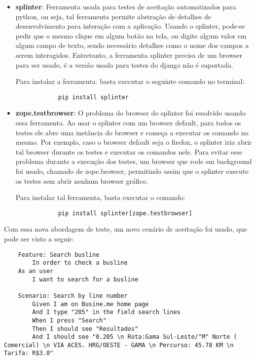     \begin{itemize}

        \item \textbf{splinter}: Ferramenta usada para testes de aceitação
            automatizados para python, ou seja, tal ferramenta permite
            abstração de detalhes de desenvolvimento para interação com a
            aplicação. Usando o splinter, pode-se pedir que o mesmo clique em
            algum botão na tela, ou digite algum valor em algum campo de texto,
            sendo necessário detalhes como o nome dos campos a serem
            interagidos. Entretanto, a ferramenta splinter precisa de um browser
            para ser usado, é a versão usada para testes do django não é
            suportada.

            Para instalar a ferramenta. basta executar o seguinte comando no
            terminal:

            \begin{verbatim}
            pip install splinter
            \end{verbatim}

        \item \textbf{zope.testbrowser}: O problema do browser do splinter foi
            resolvido usando essa ferramenta. Ao usar o splinter com um browser
            default, para todos os testes ele abre uma instância do browser e
            começa a executar os comando no mesmo. Por exemplo, caso o browser
            default seja o firefox, o splinter iria abrir tal browser durante os
            testes e executar os comandos nele. Para evitar esse problema
            durante a execução dos testes, um browser que rode em background foi
            usado, chamado de zope.browser, permitindo assim que o splinter
            execute os testes sem abrir nenhum browser gráfico.

            Para instalar tal ferramenta, basta executar o comando:

            \begin{verbatim}
            pip install splinter[zope.testbrowser]
            \end{verbatim}

        \end{itemize}


    Com essa nova abordagem de teste, um novo cenário de aceitação foi usado,
    que pode ser visto a seguir:

    \begin{verbatim}
    Feature: Search busline
    	In order to check a busline
   	As an user
    	I want to search for a busline

    Scenario: Search by line number
        Given I am on Busine.me home page
        And I type "205" in the field search lines
        When I press "Search"
        Then I should see "Resultados"
        And I should see "0.205 \n Rota:Gama Sul-Leste/"M" Norte ( Comercial) \n VIA ACES. HRG/OESTE - GAMA \n Percurso: 45.78 KM \n Tarifa: R$3.0"
    \end{verbatim}

